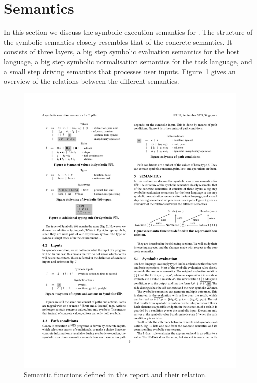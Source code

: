 
\section{Semantics}
\label{sec:semantics}

In this section we discuss the symbolic execution semantics for \TOPHAT.
The structure of the symbolic semantics closely resembles that of the concrete semantics.
It consists of three layers, a big step symbolic evaluation semantics for the host language, a big step symbolic normalisation semantics for the task language, and a small step driving semantics that processes user inputs.
Figure~\ref{fig:semantic-functions} gives an overview of the relations between the different semantics.

\begin{figure}[h]
  \centering
  \includegraphics{figures/relations}
  \caption{
    Semantic functions defined in this report and their relation.
  }
  \label{fig:semantic-functions}
\end{figure}

